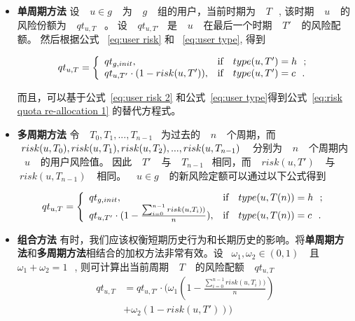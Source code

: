 \begin{itemize}
	\item \textbf{单周期方法} 设 ~$~u \in g~$~ 为 ~$~g~$~ 组的用户，当前时期为 ~$~T~$~, 该时期 ~$~u~$~ 的风险份额为 ~$~qt_{u,T}$~ 。 设 ~$~qt_{u,T'}$~ 是 ~$~u~$~ 在最后一个时期 ~$~T'~$~ 的风险配额。
	然后根据公式 ~\ref{eq:user risk} 和 ~\ref{eq:user type}, 得到
	\begin{small}
		\begin{equation}\label{eq:risk quota re-allocation 1}
		qt_{u,T}=
		\left\{
		\begin{array}{ll}
		qt_{g,init}, & \hbox{if ~$~type(u,T')=h~$~;} \\
		qt_{u,T'}\cdot (1-risk(u,T')), & \hbox{if ~$~type(u,T')=c~$~.} \\
		\end{array}
		\right.
		\end{equation}
	\end{small}
	而且，可以基于公式~\ref{eq:user risk 2} 和公式~\ref{eq:user type}得到公式~\ref{eq:risk quota re-allocation 1} 的替代方程式。
	\item \textbf{多周期方法} 令 ~$~T_0,T_1,...,T_{n-1}$~ 为过去的 ~$~n~$~ 个周期，而 ~$~risk(u,T_0),risk(u,T_1),risk(u,T_2),..., \\risk(u,T_{n-1})~$~ 分别为 ~$~n~$~ 个周期内 ~$~u~$~ 的用户风险值。 因此 ~$~T'~$~ 与 ~$~T_{n-1}$~ 相同，而 ~$~risk(u,T')~$~ 与 ~$~risk(u,T_{n-1})~$~ 相同。 ~$~u \in g~$~ 的新风险定额可以通过以下公式得到
	
	\begin{equation}\label{eq:risk quota re-allocation 2}
		qt_{u,T}=
		\left\{
		\begin{array}{ll}
		qt_{g,init}, & \hbox{if ~$~type(u,T(n))=h~$~;} \\
		qt_{u,T'}\cdot (1-\frac{ \sum _{i=0} ^ {n-1}risk(u,T_i))}{n}), & \hbox{if ~$~type(u,T(n))=c~$~.} \\
		\end{array}
		\right.
		\end{equation}
	
	\item \textbf{组合方法} 有时，我们应该权衡短期历史行为和长期历史的影响。将\textbf{单周期方法}和\textbf{多周期方法}相结合的加权方法非常有效。设 ~$\omega_1, \omega_2 \in (0,1)~$~ 且 ~$\omega_1+ \omega_2 =1~$~, 则可计算出当前周期 ~$~T~$~ 的风险配额 ~$~qt_{u,T}$~ 
	\begin{equation}\label{eq:risk quota re-allocation 3}
	\begin{aligned}
	qt_{u,T} &= qt_{u,T'}\cdot (\omega_1(1-\frac{ \sum _{i=0} ^ {n-1}risk(u,T_i))}{n}) \\
	&+ \omega_2(1-risk(u,T')))
	\end{aligned}
	\end{equation}
\end{itemize}


